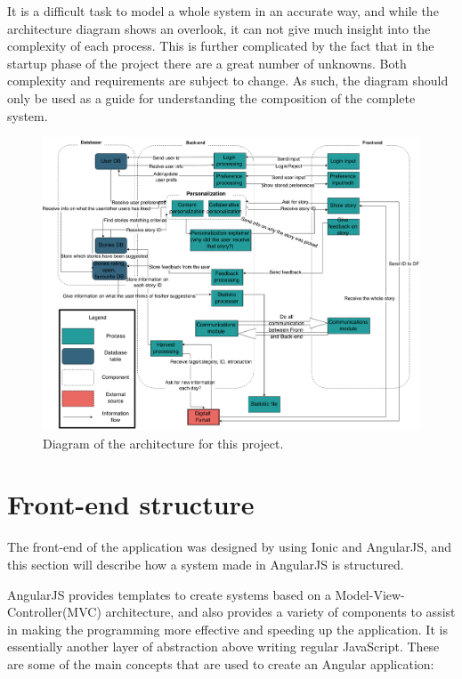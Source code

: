 It is a difficult task to model a whole system in an accurate way, and while the architecture diagram shows an overlook, it can not give much insight into the complexity of each process. This is further complicated by the fact that in the startup phase of the project there are a great number of unknowns. Both complexity and requirements are subject to change. As such, the diagram should only be used as a guide for understanding the composition of the complete system.

\begin{figure}[h!]
	\centering
	\includegraphics[width=\textwidth]{fig/architecture}
	\caption{Diagram of the architecture for this project.}
	\label{Fig:architecture}
\end{figure}

\section{Front-end structure}
\label{sec:frontend_structure}
The front-end of the application was designed by using Ionic and AngularJS, and this section will describe how a system made in AngularJS is structured.

AngularJS provides templates to create systems based on a Model-View-Controller(MVC) architecture, and also provides a variety of components to assist in making the programming more effective and speeding up the application. It is essentially another layer of abstraction above writing regular JavaScript. These are some of the main concepts that are used to create an Angular application:

